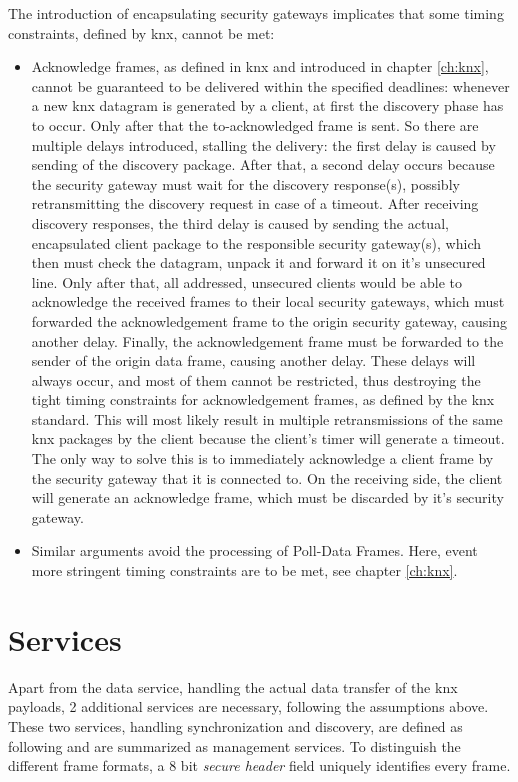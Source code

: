 The introduction of encapsulating security gateways implicates that some timing constraints, defined by \gls{knx}, cannot be met:

\begin{itemize}
 \item Acknowledge frames, as defined in \gls{knx} and introduced in chapter \ref{ch:knx}, cannot be guaranteed to be delivered within the specified deadlines: whenever
 a new \gls{knx} datagram is generated by a client, at first the discovery phase has to occur. Only after that the to-acknowledged frame is sent. So there are
 multiple delays introduced, stalling the delivery: the first delay is caused by sending of the discovery package.
 After that, a second delay occurs because the security gateway must wait for the discovery response(s), possibly retransmitting the discovery request
 in case of a timeout. After receiving discovery responses, the third delay is caused by sending the actual, encapsulated
 client package to the responsible security gateway(s), which then must check the datagram, unpack it and forward it on it's unsecured line.
 Only after that, all addressed, unsecured clients would be able to acknowledge the received frames
 to their local security gateways,
 which must forwarded the acknowledgement frame to the origin security gateway, causing another delay. Finally, the acknowledgement frame must be forwarded to the sender of
 the origin data frame, causing another delay.
 These delays will always occur, and most of them cannot be restricted, thus destroying the tight timing constraints for acknowledgement frames, as defined
 by the \gls{knx} standard. This
 will most likely result in multiple retransmissions of the same \gls{knx} packages
 by the client because the client's timer will generate a timeout. The only way to solve this is to immediately acknowledge a client frame by the security
 gateway that it is connected to. On the receiving side, the client will generate an acknowledge
 frame, which must be discarded by it's security gateway.
 \item Similar arguments avoid the processing of Poll-Data Frames. Here, event more stringent timing constraints are to be met, see chapter \ref{ch:knx}. 
\end{itemize}

\section{Services}

Apart from the data service, handling the actual data transfer of the \gls{knx} payloads, 2 additional services are necessary, following the assumptions above.
These two services, handling synchronization and discovery, are defined as following and are summarized as management services. To distinguish the different
frame formats, a 8 bit \textit{secure header} field uniquely identifies every frame.

